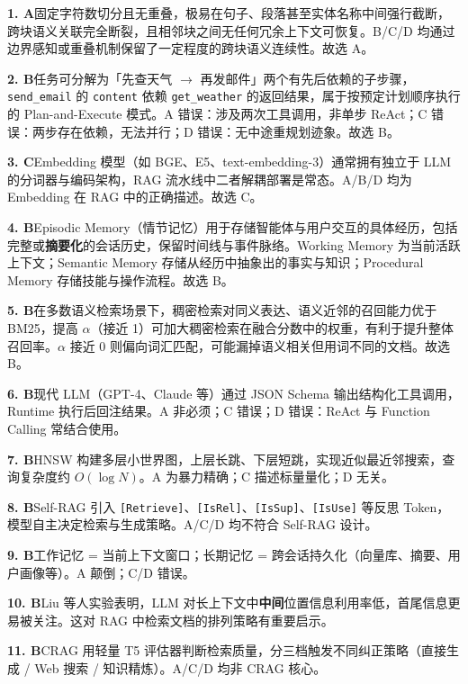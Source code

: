 \documentclass[11pt,a4paper]{article}
\begin{document}
\vspace{0.3cm}

\noindent\textbf{1. A}\quad 固定字符数切分且无重叠，极易在句子、段落甚至实体名称中间强行截断，跨块语义关联完全断裂，且相邻块之间无任何冗余上下文可恢复。B/C/D 均通过边界感知或重叠机制保留了一定程度的跨块语义连续性。故选 A。

\noindent\textbf{2. B}\quad 任务可分解为「先查天气 $\to$ 再发邮件」两个有先后依赖的子步骤，\texttt{send\_email} 的 \texttt{content} 依赖 \texttt{get\_weather} 的返回结果，属于按预定计划顺序执行的 Plan-and-Execute 模式。A 错误：涉及两次工具调用，非单步 ReAct；C 错误：两步存在依赖，无法并行；D 错误：无中途重规划迹象。故选 B。

\noindent\textbf{3. C}\quad Embedding 模型（如 BGE、E5、text-embedding-3）通常拥有独立于 LLM 的分词器与编码架构，RAG 流水线中二者解耦部署是常态。A/B/D 均为 Embedding 在 RAG 中的正确描述。故选 C。

\noindent\textbf{4. B}\quad Episodic Memory（情节记忆）用于存储智能体与用户交互的具体经历，包括完整或\textbf{摘要化}的会话历史，保留时间线与事件脉络。Working Memory 为当前活跃上下文；Semantic Memory 存储从经历中抽象出的事实与知识；Procedural Memory 存储技能与操作流程。故选 B。

\noindent\textbf{5. B}\quad 在多数语义检索场景下，稠密检索对同义表达、语义近邻的召回能力优于 BM25，提高 $\alpha$（接近 1）可加大稠密检索在融合分数中的权重，有利于提升整体召回率。$\alpha$ 接近 0 则偏向词汇匹配，可能漏掉语义相关但用词不同的文档。故选 B。

\noindent\textbf{6. B}\quad 现代 LLM（GPT-4、Claude 等）通过 JSON Schema 输出结构化工具调用，Runtime 执行后回注结果。A 非必须；C 错误；D 错误：ReAct 与 Function Calling 常结合使用。

\noindent\textbf{7. B}\quad HNSW 构建多层小世界图，上层长跳、下层短跳，实现近似最近邻搜索，查询复杂度约 $O(\log N)$。A 为暴力精确；C 描述标量量化；D 无关。

\noindent\textbf{8. B}\quad Self-RAG 引入 \texttt{[Retrieve]}、\texttt{[IsRel]}、\texttt{[IsSup]}、\texttt{[IsUse]} 等反思 Token，模型自主决定检索与生成策略。A/C/D 均不符合 Self-RAG 设计。

\noindent\textbf{9. B}\quad 工作记忆 = 当前上下文窗口；长期记忆 = 跨会话持久化（向量库、摘要、用户画像等）。A 颠倒；C/D 错误。

\noindent\textbf{10. B}\quad Liu 等人实验表明，LLM 对长上下文中\textbf{中间}位置信息利用率低，首尾信息更易被关注。这对 RAG 中检索文档的排列策略有重要启示。

\noindent\textbf{11. B}\quad CRAG 用轻量 T5 评估器判断检索质量，分三档触发不同纠正策略（直接生成 / Web 搜索 / 知识精炼）。A/C/D 均非 CRAG 核心。
\end{document}

